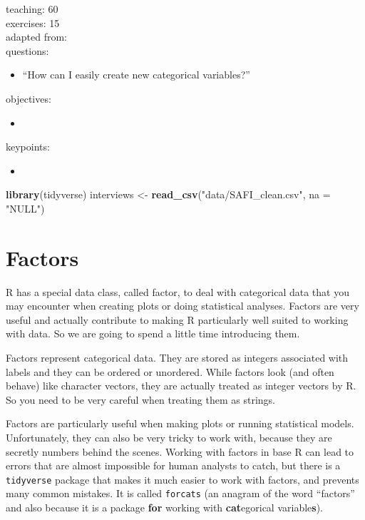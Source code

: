 \documentclass[]{book}
\newenvironment{Shaded}{\begin{snugshade}}{\end{snugshade}}
\newcommand{\KeywordTok}[1]{\textcolor[rgb]{0.13,0.29,0.53}{\textbf{#1}}}
\newcommand{\DataTypeTok}[1]{\textcolor[rgb]{0.13,0.29,0.53}{#1}}
\newcommand{\StringTok}[1]{\textcolor[rgb]{0.31,0.60,0.02}{#1}}
\newcommand{\NormalTok}[1]{#1}
\providecommand{\tightlist}{%
  \setlength{\itemsep}{0pt}\setlength{\parskip}{0pt}}
\begin{document}
teaching: 60\\
exercises: 15\\
adapted from:\\
questions:

\begin{itemize}
\tightlist
\item
  ``How can I easily create new categorical variables?''
\end{itemize}

objectives:

\begin{itemize}
\item
\end{itemize}

keypoints:

\begin{itemize}
\item
\end{itemize}

\begin{Shaded}
\begin{Highlighting}[]
\KeywordTok{library}\NormalTok{(tidyverse)}
\NormalTok{interviews <-}\StringTok{ }\KeywordTok{read_csv}\NormalTok{(}\StringTok{"data/SAFI_clean.csv"}\NormalTok{, }\DataTypeTok{na =} \StringTok{"NULL"}\NormalTok{)}
\end{Highlighting}
\end{Shaded}

\section{Factors}\label{factors}

R has a special data class, called factor, to deal with categorical data
that you may encounter when creating plots or doing statistical
analyses. Factors are very useful and actually contribute to making R
particularly well suited to working with data. So we are going to spend
a little time introducing them.

Factors represent categorical data. They are stored as integers
associated with labels and they can be ordered or unordered. While
factors look (and often behave) like character vectors, they are
actually treated as integer vectors by R. So you need to be very careful
when treating them as strings.

Factors are particularly useful when making plots or running statistical
models. Unfortunately, they can also be very tricky to work with,
because they are secretly numbers behind the scenes. Working with
factors in base R can lead to errors that are almost impossible for
human analysts to catch, but there is a \texttt{tidyverse} package that
makes it much easier to work with factors, and prevents many common
mistakes. It is called \texttt{forcats} (an anagram of the word
``factors'' and also because it is a package \textbf{for} working with
\textbf{cat}egorical variable\textbf{s}).
\end{document}
